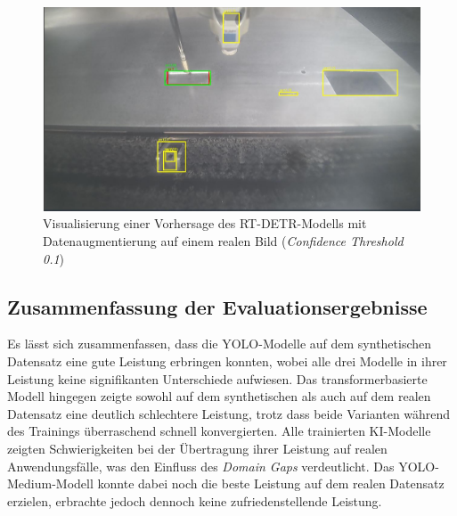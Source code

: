 \begin{figure}[htb]
      \centering                        
      \includegraphics[width=0.9\linewidth]{graphics/example_synthetic_images/Beispiel_Detektion_rtdetr.jpg}
      \caption{Visualisierung einer Vorhersage des \ac{RT-DETR}-Modells mit Datenaugmentierung auf einem realen Bild (\textit{Confidence Threshold 0.1})}
      \label{fig:beispiel_vorhersage_rtdetr}
\end{figure}

\subsection{Zusammenfassung der Evaluationsergebnisse}
Es lässt sich zusammenfassen, dass die \ac{YOLO}-Modelle auf dem synthetischen Datensatz eine gute Leistung erbringen konnten, wobei alle drei Modelle in ihrer Leistung keine signifikanten Unterschiede aufwiesen. Das transformerbasierte Modell hingegen zeigte sowohl auf dem synthetischen als auch auf dem realen Datensatz eine deutlich schlechtere Leistung, trotz dass beide Varianten während des Trainings überraschend schnell konvergierten. Alle trainierten \ac{KI}-Modelle zeigten Schwierigkeiten bei der Übertragung ihrer Leistung auf realen Anwendungsfälle, was den Einfluss des \textit{Domain Gaps} verdeutlicht. Das \ac{YOLO}-Medium-Modell konnte dabei noch die beste Leistung auf dem realen Datensatz erzielen, erbrachte jedoch dennoch keine zufriedenstellende Leistung.
